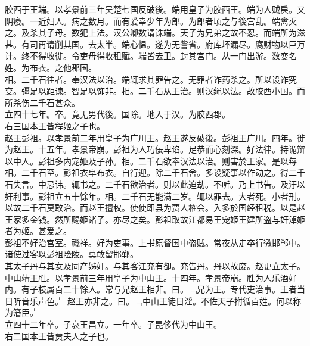 \documentclass{zhvt-classic}
\begin{document}
\hspace*{2em}胶西于王端。以孝景前三年吴楚七国反破後。端用皇子为胶西王。端为人贼戾。又阴痿。一近妇人。病之数月。而有爱幸少年为郎。为郎者顷之与後宫乱。端禽灭之。及杀其子母。数犯上法。汉公卿数请诛端。天子为兄弟之故不忍。而端所为滋甚。有司再请削其国。去太半。端心愠。遂为无訾省。府库坏漏尽。腐财物以巨万计。终不得收徙。令吏毋得收租赋。端皆去卫。封其宫门。从一门出游。数变名姓。为布衣。之他郡国。\\
\hspace*{2em}相。二千石往者。奉汉法以治。端辄求其罪告之。无罪者诈药杀之。所以设诈究变。彊足以距谏。智足以饰非。相。二千石从王治。则汉绳以法。故胶西小国。而所杀伤二千石甚众。\\
\hspace*{2em}立四十七年。卒。竟无男代後。国除。地入于汉。为胶西郡。\\
\hspace*{2em}右三国本王皆程姬之子也。\\
\hspace*{2em}赵王彭祖。以孝景前二年用皇子为广川王。赵王遂反破後。彭祖王广川。四年。徙为赵王。十五年。孝景帝崩。彭祖为人巧佞卑谄。足恭而心刻深。好法律。持诡辩以中人。彭祖多内宠姬及子孙。相。二千石欲奉汉法以治。则害於王家。是以每相。二千石至。彭祖衣皁布衣。自行迎。除二千石舍。多设疑事以作动之。得二千石失言。中忌讳。辄书之。二千石欲治者。则以此迫劫。不听。乃上书告。及汙以奸利事。彭祖立五十馀年。相。二千石无能满二岁。辄以罪去。大者死。小者刑。以故二千石莫敢治。而赵王擅权。使使即县为贾人榷会。入多於国经租税。以是赵王家多金钱。然所赐姬诸子。亦尽之矣。彭祖取故江都易王宠姬王建所盗与奸淖姬者为姬。甚爱之。\\
\hspace*{2em}彭祖不好治宫室。禨祥。好为吏事。上书原督国中盗贼。常夜从走卒行徼邯郸中。诸使过客以彭祖险陂。莫敢留邯郸。\\
\hspace*{2em}其太子丹与其女及同产姊奸。与其客江充有卻。充告丹。丹以故废。赵更立太子。\\
\hspace*{2em}中山靖王胜。以孝景前三年用皇子为中山王。十四年。孝景帝崩。胜为人乐酒好内。有子枝属百二十馀人。常与兄赵王相非。曰。﹁兄为王。专代吏治事。王者当日听音乐声色。﹂赵王亦非之。曰。﹁中山王徒日淫。不佐天子拊循百姓。何以称为籓臣。﹂\\
\hspace*{2em}立四十二年卒。子哀王昌立。一年卒。子昆侈代为中山王。\\
\hspace*{2em}右二国本王皆贾夫人之子也。\\
\end{document}
